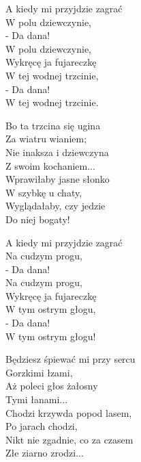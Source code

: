 \begin{text}
    \hfill\break
A kiedy mi przyjdzie zagrać\\
W polu dziewczynie,\\
- Da dana!\\
W polu dziewczynie,\\
Wykręcę ja fujareczkę\\
W tej wodnej trzcinie,\\
- Da dana!\\
W tej wodnej trzcinie.

Bo ta trzcina się ugina\\
Za wiatru wianiem;\\
Nie inaksza i dziewczyna\\
Z swoim kochaniem...\\
Wprawiłaby jasne słonko\\
W szybkę u chaty,\\
Wyglądałaby, czy jedzie\\
Do niej bogaty!

A kiedy mi przyjdzie zagrać\\
Na cudzym progu,\\
- Da dana!\\
Na cudzym progu,\\
Wykręcę ja fujareczkę\\
W tym ostrym głogu,\\
- Da dana!\\
W tym ostrym głogu!

Będziesz śpiewać mi przy sercu\\
Gorzkimi łzami,\\
Aż poleci głos żałosny\\
Tymi łanami...\\
Chodzi krzywda popod lasem,\\
Po jarach chodzi,\\
Nikt nie zgadnie, co za czasem\\
Złe ziarno zrodzi...
\end{text}
